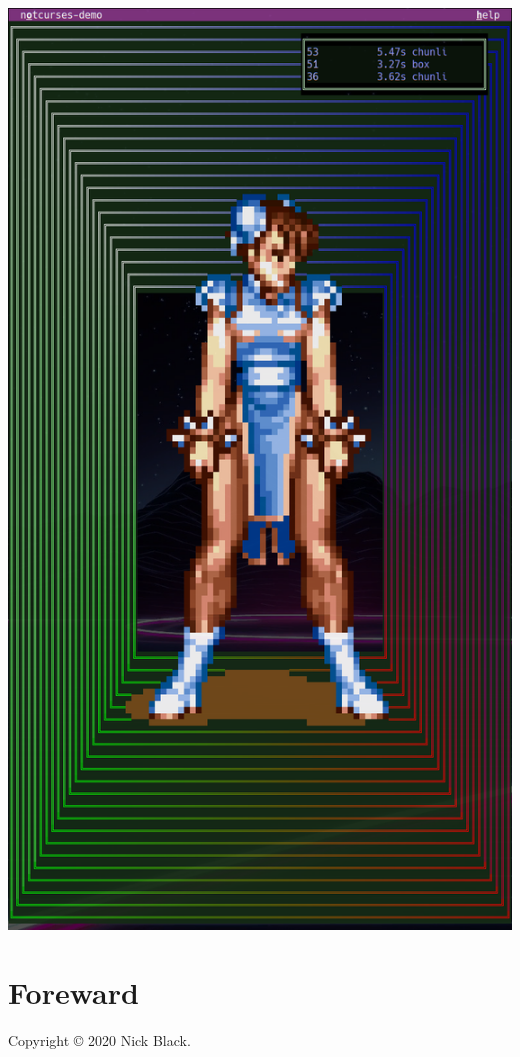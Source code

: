 \documentclass[letterpaper,10pt]{article}
\begin{document}
\tableofcontents

\cleardoublepage
{}
{}
\listoffigures
\clearpage

\newpage
\vfill
\begin{center}
\includegraphics[width=.75\linewidth]{media/chunli-box-front.png}
\end{center}
\vfill
\clearpage

\section{Foreward}
Copyright © 2020 Nick Black.
\end{document}
